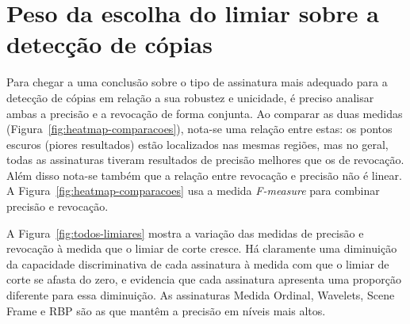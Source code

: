 \section{Peso da escolha do limiar sobre a detecção de cópias}

Para chegar a uma conclusão sobre o tipo de assinatura mais adequado para a detecção de cópias em relação a sua robustez e unicidade, é preciso analisar ambas a precisão e a revocação de forma conjunta. Ao comparar as duas medidas (Figura~\ref{fig:heatmap-comparacoes}), nota-se uma relação entre estas: os pontos escuros (piores resultados) estão localizados nas mesmas regiões, mas no geral, todas as assinaturas tiveram resultados de precisão melhores que os de revocação. Além disso nota-se também que a relação entre revocação e precisão não é linear. A Figura~\ref{fig:heatmap-comparacoes} usa a medida \textit{F-measure} para combinar precisão e revocação.

A Figura~\ref{fig:todos-limiares} mostra a variação das medidas de precisão e revocação à medida que o limiar de corte cresce. Há claramente uma diminuição da capacidade discriminativa de cada assinatura à medida com que o limiar de corte se afasta do zero, e evidencia que cada assinatura apresenta uma proporção diferente para essa diminuição. As assinaturas Medida Ordinal, Wavelets, Scene Frame e RBP são as que mantêm a precisão em níveis mais altos. 



